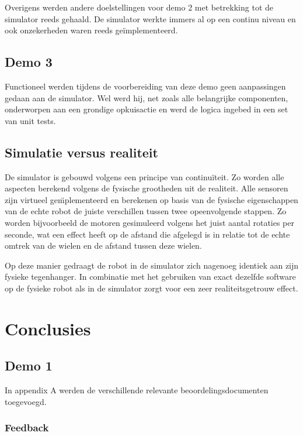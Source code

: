 \documentclass[12pt,a4paper]{report}
\begin{document}
Overigens werden andere doelstellingen voor demo 2 met betrekking tot de simulator reeds gehaald. De simulator werkte immers al op een continu niveau en ook onzekerheden waren reeds ge\"implementeerd.

\section{Demo 3}

Functioneel werden tijdens de voorbereiding van deze demo geen aanpassingen gedaan aan de simulator. Wel werd hij, net zoals alle belangrijke componenten, onderworpen aan een grondige opkuisactie en werd de logica ingebed in een set van unit tests.

\section{Simulatie versus realiteit}

De simulator is gebouwd volgens een principe van continu\"iteit. Zo worden alle aspecten berekend volgens de fysische grootheden uit de realiteit. Alle sensoren zijn virtueel ge\"mplementeerd en berekenen op basis van de fysische eigenschappen van de echte robot de juiste verschillen tussen twee opeenvolgende stappen. Zo worden bijvoorbeeld de motoren gesimuleerd volgens het juist aantal rotaties per seconde, wat een effect heeft op de afstand die afgelegd is in relatie tot de echte omtrek van de wielen en de afstand tussen deze wielen.

Op deze manier gedraagt de robot in de simulator zich nagenoeg identiek aan zijn fysieke tegenhanger. In combinatie met het gebruiken van exact dezelfde software op de fysieke robot als in de simulator zorgt voor een zeer realiteitsgetrouw effect.

\chapter{Conclusies}

\section{Demo 1}

In appendix A werden de verschillende relevante beoordelingsdocumenten toegevoegd.

\subsection{Feedback}
\end{document}
